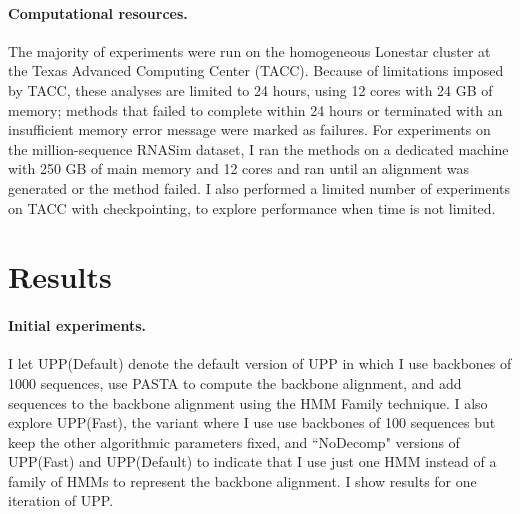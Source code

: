 \paragraph{Computational resources. }
The majority of experiments were run on the
homogeneous Lonestar  cluster at
the Texas Advanced Computing Center (TACC).
Because of limitations imposed by TACC, these
analyses are limited to 24 hours, using
 12 cores with 24 GB of memory;
methods that failed to complete within 24 hours or 
terminated with an insufficient memory error message were marked as failures.  
For experiments on the million-sequence RNASim dataset,
I ran the methods on a 
dedicated machine with 250 GB of main 
memory and 12 cores and ran until an alignment 
was generated or the method failed.  
I also performed a limited number of experiments on TACC with
checkpointing, to explore performance 
when time is not limited.  


\section{Results}\label{upp:results}
\paragraph{Initial experiments. }
I let UPP(Default) denote the default version of UPP
in which I use
backbones of 1000 sequences, use PASTA to compute
the backbone alignment, and add sequences to  the backbone
alignment using
the HMM Family technique.
I also explore UPP(Fast), the variant
where I use   use backbones of 100 sequences but keep the
other algorithmic parameters fixed, and ``NoDecomp"
versions of UPP(Fast) and UPP(Default)
to indicate that
I use just one HMM instead of a family of HMMs
to represent the backbone alignment.
I show results for one iteration of UPP.


